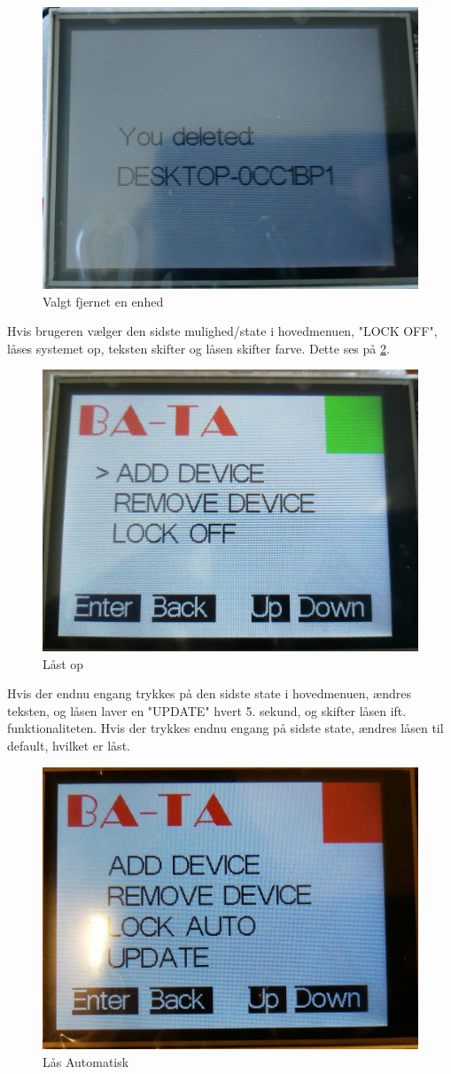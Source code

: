 \begin{figure}[H]
	\centering
	\includegraphics[width = 300 pt]{Img/delete.jpg}
	\caption{Valgt fjernet en enhed}
	\label{fig:delete}
\end{figure}
Hvis brugeren vælger den sidste mulighed/state i hovedmenuen, "LOCK OFF", låses systemet op, teksten skifter og låsen skifter farve. Dette ses på \ref{fig:lockOff}.
\begin{figure}[H]
	\centering
	\includegraphics[width = 300 pt]{Img/lockOff.jpg}
	\caption{Låst op}
	\label{fig:lockOff}
\end{figure}
Hvis der endnu engang trykkes på den sidste state i hovedmenuen, ændres teksten, og låsen laver en "UPDATE" hvert 5. sekund, og skifter låsen ift. funktionaliteten. Hvis der trykkes endnu engang på sidste state, ændres låsen til default, hvilket er låst. 
\begin{figure}[H]
	\centering
	\includegraphics[width = 300 pt]{Img/auto.jpg}
	\caption{Lås Automatisk}
	\label{fig:auto}
\end{figure}

